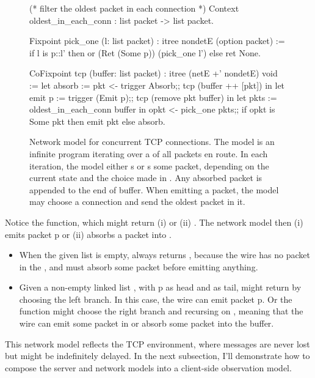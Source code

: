 \begin{figure}
\begin{coq}
(* filter the oldest packet in each connection *)
Context oldest_in_each_conn : list packet -> list packet.

Fixpoint pick_one (l: list packet) : itree nondetE (option packet) :=%
  if l is p::l'
  then or (Ret (Some p)) (pick_one l')
  else ret None.

CoFixpoint tcp (buffer: list packet) : itree (netE +' nondetE) void :=
  let absorb := pkt <- trigger Absorb;;
                tcp (buffer ++ [pkt])      in
  let emit p := trigger (Emit p);;
                tcp (remove pkt buffer)    in
  let pkts   := oldest_in_each_conn buffer in
  opkt <- pick_one pkts;;
  if opkt is Some pkt
  then emit pkt
  else absorb.
\end{coq}
\caption[Network model for concurrent TCP connections]{Network model for
  concurrent TCP connections.  The model is an infinite program iterating over a
   of all packets en route.  In each iteration, the model either
  s or s some packet, depending on the current
   state and the choice made in .  Any absorbed packet
  is appended to the end of buffer.  When emitting a packet, the model may
  choose a connection and send the oldest packet in it.}
\label{fig:tcp-model}
\end{figure}

Notice the  function, which might return (i)  or (ii)
.  The network model then (i) emits packet \ilc p or (ii) absorbs a
packet into .

\begin{itemize}
\item When the given list  is empty,  always returns
  , because the wire has no packet in the , and must
  absorb some packet before emitting anything.
\item Given a non-empty linked list , with \ilc p as head and
   as tail,  might return  by choosing the
  left branch.  In this case, the wire can emit packet \ilc p.  Or the function
  might choose the right branch and recursing on , meaning that the wire
  can emit some packet in  or absorb some packet into the buffer.
\end{itemize}

This network model reflects the TCP environment, where messages are never lost
but might be indefinitely delayed.  In the next subsection, I'll demonstrate how
to compose the server and network models into a client-side observation model.

